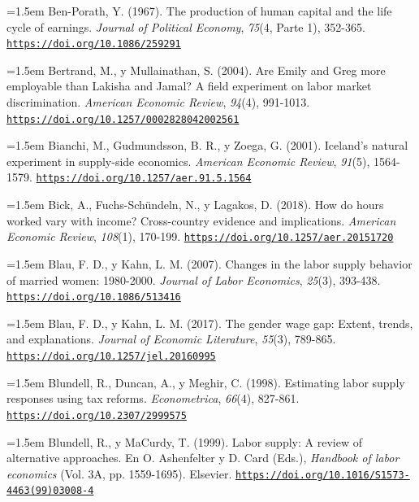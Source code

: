 \documentclass[10pt,a4paper]{article}
\begin{document}
\noindent\hangindent=1.5em Ben-Porath, Y. (1967). The production of human capital and the life cycle of earnings. \textit{Journal of Political Economy}, \textit{75}(4, Parte 1), 352-365. \href{https://doi.org/10.1086/259291}{\nolinkurl{https://doi.org/10.1086/259291}}

\noindent\hangindent=1.5em Bertrand, M., y Mullainathan, S. (2004). Are Emily and Greg more employable than Lakisha and Jamal? A field experiment on labor market discrimination. \textit{American Economic Review}, \textit{94}(4), 991-1013. \href{https://doi.org/10.1257/0002828042002561}{\nolinkurl{https://doi.org/10.1257/0002828042002561}}

\noindent\hangindent=1.5em Bianchi, M., Gudmundsson, B. R., y Zoega, G. (2001). Iceland's natural experiment in supply-side economics. \textit{American Economic Review}, \textit{91}(5), 1564-1579. \href{https://doi.org/10.1257/aer.91.5.1564}{\nolinkurl{https://doi.org/10.1257/aer.91.5.1564}}

\noindent\hangindent=1.5em Bick, A., Fuchs-Schündeln, N., y Lagakos, D. (2018). How do hours worked vary with income? Cross-country evidence and implications. \textit{American Economic Review}, \textit{108}(1), 170-199. \href{https://doi.org/10.1257/aer.20151720}{\nolinkurl{https://doi.org/10.1257/aer.20151720}}

\noindent\hangindent=1.5em Blau, F. D., y Kahn, L. M. (2007). Changes in the labor supply behavior of married women: 1980-2000. \textit{Journal of Labor Economics}, \textit{25}(3), 393-438. \href{https://doi.org/10.1086/513416}{\nolinkurl{https://doi.org/10.1086/513416}}

\noindent\hangindent=1.5em Blau, F. D., y Kahn, L. M. (2017). The gender wage gap: Extent, trends, and explanations. \textit{Journal of Economic Literature}, \textit{55}(3), 789-865. \href{https://doi.org/10.1257/jel.20160995}{\nolinkurl{https://doi.org/10.1257/jel.20160995}}

\noindent\hangindent=1.5em Blundell, R., Duncan, A., y Meghir, C. (1998). Estimating labor supply responses using tax reforms. \textit{Econometrica}, \textit{66}(4), 827-861. \href{https://doi.org/10.2307/2999575}{\nolinkurl{https://doi.org/10.2307/2999575}}

\noindent\hangindent=1.5em Blundell, R., y MaCurdy, T. (1999). Labor supply: A review of alternative approaches. En O. Ashenfelter y D. Card (Eds.), \textit{Handbook of labor economics} (Vol. 3A, pp. 1559-1695). Elsevier. \href{https://doi.org/10.1016/S1573-4463(99)03008-4}{\nolinkurl{https://doi.org/10.1016/S1573-4463(99)03008-4}}
\end{document}

